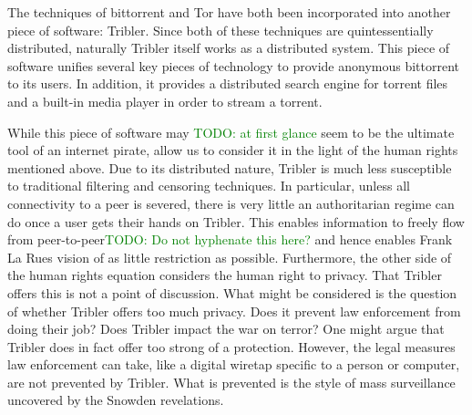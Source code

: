 \documentclass[a4paper,11pt]{book}
\newcommand\suggestion[1]{\textcolor{green}{TODO: #1}}
\theoremstyle{definition}
\begin{document}
The techniques of bittorrent and Tor have both been incorporated into another piece
of software: Tribler. Since both of these techniques are quintessentially distributed,
naturally Tribler itself works as a distributed system. This piece of software unifies
several key pieces of technology to provide anonymous bittorrent to its users. In addition,
it provides a distributed search engine for torrent files and a built-in media player in
order to stream a torrent. 

While this piece of software may \suggestion{at first glance} seem to be the ultimate tool of an internet pirate, 
allow us to consider it in the light of the human rights mentioned above. Due to its
distributed nature, Tribler is much less susceptible to traditional filtering and
censoring techniques. In particular, unless all connectivity to a peer is severed,
there is very little an authoritarian regime can do once a user gets their hands
on Tribler. This enables information to freely flow from peer-to-peer\suggestion{Do not hyphenate this here?} and hence 
enables Frank La Rues vision of as little restriction as possible. 
Furthermore, the other side of the human rights equation considers the human
right to privacy. That Tribler offers this is not a point of discussion. What might
be considered is the question of whether Tribler offers too much privacy. Does it
prevent law enforcement from doing their job? Does Tribler impact the war on terror?
One might argue that Tribler does in fact offer too strong of a protection.
However, the legal measures law enforcement can take, like a digital
wiretap specific to a person or computer, are not prevented by Tribler. What is
prevented is the style of mass surveillance uncovered by the Snowden revelations. 
\end{document}
